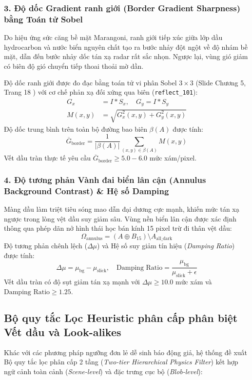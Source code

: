 \subsubsection{3. Độ dốc Gradient ranh giới (Border Gradient Sharpness) bằng Toán tử Sobel}
Do hiệu ứng sức căng bề mặt Marangoni, ranh giới tiếp xúc giữa lớp dầu hydrocarbon và nước biển nguyên chất tạo ra bước nhảy đột ngột về độ nhám bề mặt, dẫn đến bước nhảy dốc tán xạ radar rất sắc nhọn. Ngược lại, vùng gió giảm có biên độ gió chuyển tiếp thoai thoải mờ dần.

Độ dốc ranh giới được đo đạc bằng toán tử vi phân Sobel $3 \times 3$ (Slide Chương 5, Trang 18 \cite{toan2024xla}) với cơ chế phản xạ đối xứng qua biên (\texttt{reflect\_101}):
\begin{align}
    G_x &= I * S_x, \quad G_y = I * S_y \\
    M(x, y) &= \sqrt{G_x^2(x, y) + G_y^2(x, y)}
\end{align}
Độ dốc trung bình trên toàn bộ đường bao biên $\beta(A)$ được tính:
\begin{equation}
    \overline{G}_{\text{border}} = \frac{1}{|\beta(A)|} \sum_{(x,y) \in \beta(A)} M(x, y)
\end{equation}
Vết dầu tràn thực tế yêu cầu $\overline{G}_{\text{border}} \ge 5.0 - 6.0$ mức xám/pixel.

\subsubsection{4. Độ tương phản Vành đai biển lân cận (Annulus Background Contrast) & Hệ số Damping}
Màng dầu làm triệt tiêu sóng mao dẫn đại dương cực mạnh, khiến mức tán xạ ngược trong lòng vệt dầu suy giảm sâu. Vùng nền biển lân cận được xác định thông qua phép dãn nở hình thái học bán kính 15 pixel trừ đi thân vệt dầu:
\begin{equation}
    \Omega_{\text{annulus}} = (A \oplus B_{15}) \setminus A_{\text{all\_dark}}
\end{equation}
Độ tương phản chênh lệch ($\Delta \mu$) và Hệ số suy giảm tín hiệu (\textit{Damping Ratio}) được tính:
\begin{equation}
    \Delta \mu = \mu_{\text{bg}} - \mu_{\text{slick}}, \quad \text{Damping Ratio} = \frac{\mu_{\text{bg}}}{\mu_{\text{slick}} + \epsilon}
\end{equation}
Vết dầu tràn có độ sụt giảm tán xạ mạnh với $\Delta \mu \ge 10.0$ mức xám và $\text{Damping Ratio} \ge 1.25$.

\subsection{Bộ quy tắc Lọc Heuristic phân cấp phân biệt Vết dầu và Look-alikes}
\label{subsec:heuristic_rules}
Khác với các phương pháp ngưỡng đơn lẻ dễ sinh báo động giả, hệ thống đề xuất Bộ quy tắc lọc phân cấp 2 tầng (\textit{Two-tier Hierarchical Physics Filter}) kết hợp ngữ cảnh toàn cảnh (\textit{Scene-level}) và đặc trưng cục bộ (\textit{Blob-level}):

